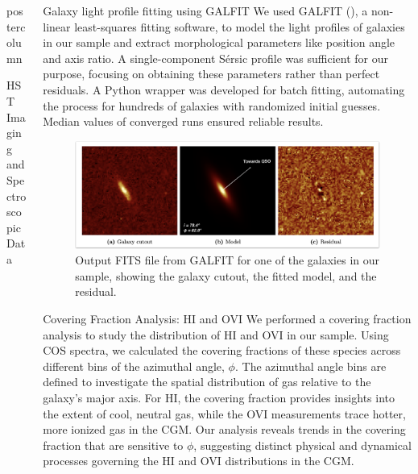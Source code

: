 \documentclass{beamer}
\begin{document}
\begin{frame}
\begin{columns}[T]
\begin{column}{0.48\textwidth}
\begin{beamercolorbox}[center,wd=\textwidth]{postercolumn}
\begin{block}{HST Imaging and Spectroscopic Data}
        \end{block}\vspace{-0.5cm}
      \end{beamercolorbox}
    \end{column}
    \begin{column}{0.48\textwidth}
      \begin{block}{Galaxy light profile fitting using GALFIT}
        We used GALFIT (\cite{2010AJ....139.2097P}), a non-linear least-squares fitting software, to model the light profiles of galaxies in our sample and extract morphological parameters like position angle and axis ratio. A single-component Sérsic profile was sufficient for our purpose, focusing on obtaining these parameters rather than perfect residuals. A Python wrapper was developed for batch fitting, automating the process for hundreds of galaxies with randomized initial guesses. Median values of converged runs ensured reliable results.
        \begin{figure}
          \centering
          \includegraphics[width=\textwidth]{./images/galfit_model}
          \caption{Output FITS file from GALFIT for one of the galaxies in our sample, showing the galaxy cutout, the fitted model, and the residual.}
        \end{figure}
      \end{block}
      \vspace{1.1cm}
      \begin{block}{Covering Fraction Analysis: HI and OVI}
        We performed a covering fraction analysis to study the distribution of HI and OVI in our sample. Using COS spectra, we calculated the covering fractions of these species across different bins of the azimuthal angle, $\phi$. The azimuthal angle bins are defined to investigate the spatial distribution of gas relative to the galaxy's major axis. For HI, the covering fraction provides insights into the extent of cool, neutral gas, while the OVI measurements trace hotter, more ionized gas in the CGM. Our analysis reveals trends in the covering fraction that are sensitive to $\phi$, suggesting distinct physical and dynamical processes governing the HI and OVI distributions in the CGM.

\end{block}
\end{column}
\end{columns}
\end{frame}
\end{document}

